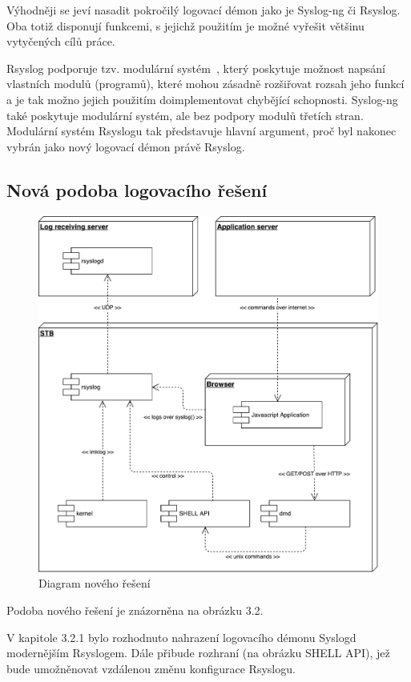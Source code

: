 \documentclass[thesis=B,czech]{FITthesis}[2012/06/26]
\begin{document}
Výhodněji se jeví nasadit pokročilý logovací démon jako je Syslog-ng či Rsyslog. Oba totiž disponují funkcemi, s jejichž použitím je možné vyřešit většinu vytyčených cílů práce.

Rsyslog podporuje tzv. modulární systém~\cite{rsysModules}, který poskytuje možnost napsání vlastních modulů (programů), které mohou zásadně rozšiřovat rozsah jeho funkcí a je tak možno jejich použitím doimplementovat chybějící schopnosti. Syslog-ng také poskytuje modulární systém, ale bez podpory modulů třetích stran. Modulární systém Rsyslogu tak představuje hlavní argument, proč byl nakonec vybrán jako nový logovací démon právě Rsyslog.

\subsection{Nová podoba logovacího řešení}
\begin{figure}[H]
	\centering
	\includegraphics[scale=0.5]{images/diagram-noveho-reseni}
	\caption[Diagram nového řešení]{Diagram nového řešení}
\end{figure}

Podoba nového řešení je znázorněna na obrázku 3.2.

V kapitole 3.2.1 bylo rozhodnuto nahrazení logovacího démonu Syslogd modernějším Rsyslogem. Dále přibude rozhraní (na obrázku SHELL API), jež bude umožněnovat vzdálenou změnu konfigurace Rsyslogu. 
\end{document}
